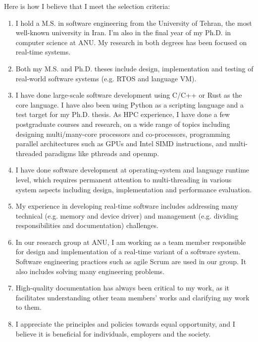 \documentclass[11pt,a4paper,calibri]{moderncv}
\begin{document}
Here is how I believe that I meet the selection criteria:
\vspace{0.2cm}
    \begin{enumerate}
        \item I hold a M.S. in software engineering from the University of Tehran, the most well-known university in Iran.
        I'm also in the final year of my Ph.D. in computer science at ANU.
        My research in both degrees has been focused on real-time systems.
        \item Both my M.S. and Ph.D. theses include design, implementation and testing of real-world software systems (e.g. RTOS and language VM).
        \item I have done large-scale software development using C/C++ or Rust as the core language. I have also been using Python as a scripting language and a test target for my Ph.D. thesis. As HPC experience, I have done a few postgraduate courses and research, on a wide range of topics including designing multi/many-core processors and co-processors, programming parallel architectures such as GPUs and Intel SIMD instructions, and multi-threaded paradigms like pthreads and openmp.
        \item I have done software development at operating-system and language runtime level, which requires permanent attention to multi-threading in various system aspects including design, implementation and performance evaluation.
        \item My experience in developing real-time software includes addressing many technical (e.g. memory and device driver) and management (e.g. dividing responsibilities and documentation) challenges.
        \item In our research group at ANU, I am working as a team member responsible for design and implementation of a real-time variant of a software system. Software engineering practices such as agile Scrum are used in our group. It also includes solving many engineering problems.
        \item High-quality documentation has always been critical to my work, as it facilitates understanding other team members' works and clarifying my work to them.
        \item I appreciate the principles and policies towards equal opportunity, and I believe it is beneficial for individuals, employers and the society.
    \end{enumerate}

\end{document}
